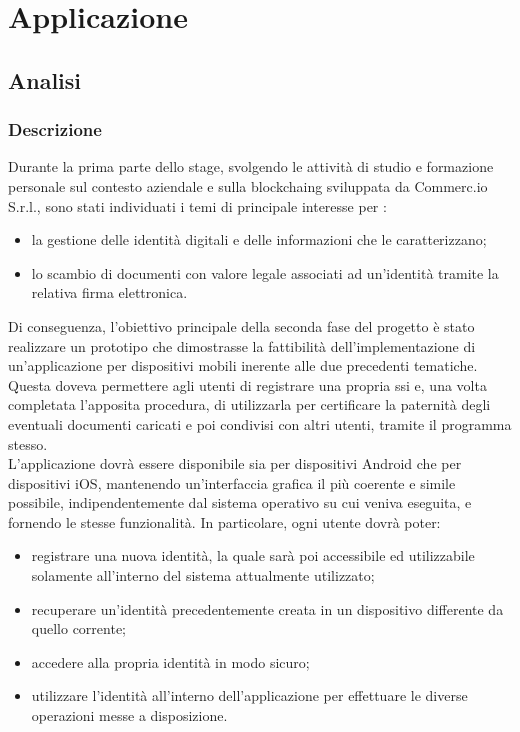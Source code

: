 
\chapter{Applicazione}
\label{cap:applicazione}

\section{Analisi}

\subsection{Descrizione}

Durante la prima parte dello stage, svolgendo le attività di studio e formazione personale sul contesto aziendale e sulla \gls{blockchaing} sviluppata da Commerc.io S.r.l., sono stati individuati i temi di principale interesse per \myCompany{} \companyTitle:

\begin{itemize}
	\item la gestione delle identità digitali e delle informazioni che le caratterizzano;
	\item lo scambio di documenti con valore legale associati ad un'identità tramite la relativa firma elettronica.
\end{itemize}

Di conseguenza, l'obiettivo principale della seconda fase del progetto è stato realizzare un prototipo che dimostrasse la fattibilità dell'implementazione di un'applicazione per dispositivi mobili inerente alle due precedenti tematiche. Questa doveva permettere agli utenti di registrare una propria \gls{ssi} e, una volta completata l'apposita procedura, di utilizzarla per certificare la paternità degli eventuali documenti caricati e poi condivisi con altri utenti, tramite il programma stesso.\\
L'applicazione dovrà essere disponibile sia per dispositivi Android che per dispositivi iOS, mantenendo un'interfaccia grafica il più coerente e simile possibile, indipendentemente dal sistema operativo su cui veniva eseguita, e fornendo le stesse funzionalità. In particolare, ogni utente dovrà poter:

\begin{itemize}
	\item registrare una nuova identità, la quale sarà poi accessibile ed utilizzabile solamente all'interno del sistema attualmente utilizzato;
	\item recuperare un'identità precedentemente creata in un dispositivo differente da quello corrente;
	\item accedere alla propria identità in modo sicuro;
	\item utilizzare l'identità all'interno dell'applicazione per effettuare le diverse operazioni messe a disposizione.
\end{itemize}

